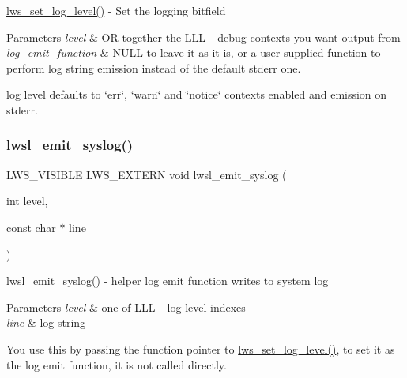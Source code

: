 \hyperlink{group__log_ga244647f9e1bf0097ccdde66d74f41e26}{lws\+\_\+set\+\_\+log\+\_\+level()} -\/ Set the logging bitfield 
\begin{DoxyParams}{Parameters}
{\em level} & OR together the L\+L\+L\+\_\+ debug contexts you want output from \\
\hline
{\em log\+\_\+emit\+\_\+function} & N\+U\+LL to leave it as it is, or a user-\/supplied function to perform log string emission instead of the default stderr one.\\
\hline
\end{DoxyParams}
log level defaults to \char`\"{}err\char`\"{}, \char`\"{}warn\char`\"{} and \char`\"{}notice\char`\"{} contexts enabled and emission on stderr. \mbox{\label{group__log_gab7c0fc936cc9f1eb58e2bb234c15147c}} 
\subsubsection{\texorpdfstring{lwsl\+\_\+emit\+\_\+syslog()}{lwsl\_emit\_syslog()}}
{\footnotesize\ttfamily L\+W\+S\+\_\+\+V\+I\+S\+I\+B\+LE L\+W\+S\+\_\+\+E\+X\+T\+E\+RN void lwsl\+\_\+emit\+\_\+syslog (\begin{DoxyParamCaption}\item[{int}]{level,  }\item[{const char $\ast$}]{line }\end{DoxyParamCaption})}

\hyperlink{group__log_gab7c0fc936cc9f1eb58e2bb234c15147c}{lwsl\+\_\+emit\+\_\+syslog()} -\/ helper log emit function writes to system log


\begin{DoxyParams}{Parameters}
{\em level} & one of L\+L\+L\+\_\+ log level indexes \\
\hline
{\em line} & log string\\
\hline
\end{DoxyParams}
You use this by passing the function pointer to \hyperlink{group__log_ga244647f9e1bf0097ccdde66d74f41e26}{lws\+\_\+set\+\_\+log\+\_\+level()}, to set it as the log emit function, it is not called directly. \mbox{\label{group__log_ga898b1f03872ad019f507d4e35bbefa90}} 
